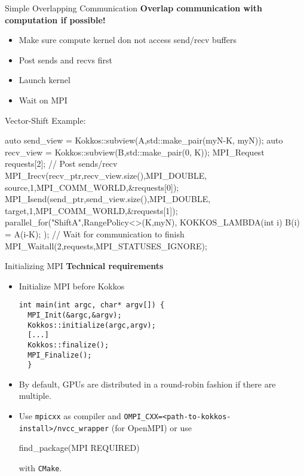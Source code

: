 \begin{frame}[fragile]{Simple Overlapping Communication}
  \textbf{Overlap communication with computation if possible!}

  \begin{itemize}
     \item Make sure compute kernel don not access send/recv buffers
     \item Post sends and recvs first
     \item Launch kernel
     \item Wait on MPI
  \end{itemize}

  \pause
  Vector-Shift Example:
\begin{code}[keywords={subview,MPI_Request,MPI_Irecv,MPI_Isend,parallel_for,MPI_Waitall}]
auto send_view = Kokkos::subview(A,std::make_pair(myN-K, myN));
auto recv_view = Kokkos::subview(B,std::make_pair(0, K));
MPI_Request requests[2];
// Post sends/recv
MPI_Irecv(recv_ptr,recv_view.size(),MPI_DOUBLE,
          source,1,MPI_COMM_WORLD,&requests[0]);
MPI_Isend(send_ptr,send_view.size(),MPI_DOUBLE,
          target,1,MPI_COMM_WORLD,&requests[1]);
parallel_for("ShiftA",RangePolicy<>(K,myN), 
  KOKKOS_LAMBDA(int i) { B(i) = A(i-K); });
// Wait for communication to finish
MPI_Waitall(2,requests,MPI_STATUSES_IGNORE);
\end{code}
\end{frame}


\begin{frame}[fragile]{Initializing MPI}
\textbf{Technical requirements}
\begin{itemize}
    \item Initialize MPI before Kokkos
    \begin{lstlisting}
int main(int argc, char* argv[]) {
  MPI_Init(&argc,&argv);
  Kokkos::initialize(argc,argv);
  [...]
  Kokkos::finalize();
  MPI_Finalize();
  }
    \end{lstlisting}
    \item By default, GPUs are distributed in a round-robin fashion if there are multiple.
	\item Use \texttt{mpicxx} as compiler
 	and \texttt{OMPI\_CXX=<path-to-kokkos-install>/nvcc\_wrapper} (for OpenMPI)
  	or use
\begin{texttt}find\_package(MPI REQUIRED)\end{texttt}
 with \texttt{CMake}.
\end{itemize}
\end{frame}


